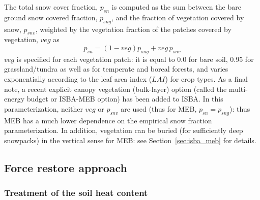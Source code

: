 The total snow cover fraction, $p_{sn}$ 
is computed as the sum between the bare
ground snow covered fraction, $p_{sng}$, and the fraction of vegetation
covered by snow, $p_{snv}$, weighted by the vegetation fraction of the
patches covered by vegetation, $veg$ as
%
\begin{equation}
\label{eq:isba_snow_frac_total}
p_{sn} = (1-veg) p_{sng} + veg \, p_{snv}
%
\end{equation}
%
$veg$ is specified for each
vegetation patch: it is equal to 0.0 for bare soil, 0.95 for
grassland/tundra as well as for temperate and boreal forests, and
varies exponentially according to the leaf area index ($LAI$) for crop
types.
%
As a final note, a recent explicit canopy vegetation (bulk-layer)
option (called the multi-energy budget or ISBA-MEB option)
has been added to ISBA. In this parameterization, 
neither $veg$ or $p_{snv}$ are used 
(thus for MEB, $p_{sn}=p_{sng}$): thus MEB has a much lower
dependence on the empirical snow fraction
parameterization. In addition, vegetation can be buried (for
sufficiently deep snowpacks) in the
vertical sense for MEB: see Section~\ref{sec:isba_meb} for details.

\subsection{Force restore approach}

\subsubsection{Treatment of the soil heat content}

